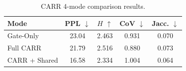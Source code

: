 \begin{table}[t]
\centering
\small
\begin{tabular}{lcccc}
\toprule
\textbf{Mode} & \textbf{PPL} $\downarrow$ & \textbf{$H$} $\uparrow$ & \textbf{CoV} $\downarrow$ & \textbf{Jacc.} $\downarrow$ \\
\midrule
Gate-Only & 23.04 & 2.463 & 0.931 & 0.070 \\
Full CARR & 21.79 & 2.516 & 0.880 & 0.073 \\
CARR + Shared & 16.58 & 2.334 & 1.004 & 0.064 \\
\bottomrule
\end{tabular}
\caption{CARR 4-mode comparison results.}
\label{tab:carr-comparison}
\end{table}
